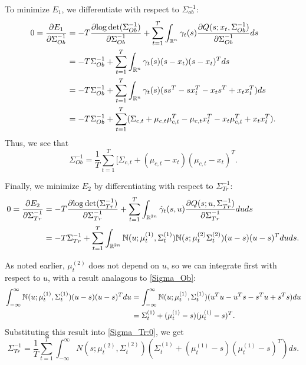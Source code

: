 \documentclass[12pt,leqno]{article}
\begin{document}
To minimize $E_1$, we differentiate with respect to $\Sigma_{ob}^{-1}$:
\begin{align*}
  0 = \frac{\partial{E_1}}{\partial{\Sigma_{Ob}^{-1}}} &= -T\frac{\partial{\log\det(\Sigma_{Ob}^{-1})}}{\partial\Sigma_{Ob}^{-1}}
  + \sum_{t=1}^T\int_{{\mathbb R}^n}\gamma_t(s)\frac{\partial{Q(s;x_t,\Sigma_{Ob}^{-1})}}{\partial{\Sigma_{Ob}^{-1}}}ds \\
  &= -T\Sigma_{Ob}^{-1} + \sum_{t=1}^T\int_{{\mathbb R}^n}\gamma_t(s)(s-x_t)(s-x_t)^Tds\\
  &= -T\Sigma_{Ob}^{-1} + \sum_{t=1}^T\int_{{\mathbb R}^n}\gamma_t(s)(ss^T - sx_t^T - x_ts^T + x_tx_t^T)ds \\
  &= -T\Sigma_{Ob}^{-1} + \sum_{t=1}^T(\Sigma_{c,t} + \mu_{c,t}\mu_{c,t}^T -\mu_{c,t}x_t^T- x_t\mu_{c,t}^T + x_tx_t^T).
\end{align*}
Thus, we see that
\begin{equation}\label{Sigma_Ob}
  \Sigma_{Ob}^{-1} = \frac{1}{T}\sum_{t=1}^T [\Sigma_{c,t} + (\mu_{c,t}-x_t)(\mu_{c,t}-x_t)^T.
\end{equation}

Finally, we minimize $E_2$ by differentiating with respect to $\Sigma_{Tr}^{-1}$:
\begin{equation}\label{Sigma_Tr:0}
  \begin{split}
  0 = \frac{\partial{E_2}}{\partial{\Sigma_{Tr}^{-1}}} &= -T\frac{\partial{\log\det(\Sigma_{Tr}^{-1})}}{\partial\Sigma_{Tr}^{-1}}
  + \sum_{t=1}^T\int_{{\mathbb R}^{2n}}\hat{\gamma}_t(s,u)\frac{\partial{Q(s;u,\Sigma_{Tr}^{-1})}}{\partial\Sigma_{Tr}^{-1}}duds \\
      &= -T\Sigma_{Tr}^{-1} + \sum_{t=1}^T\int_{{\mathbb R}^{2n}}{\mathbb N}(u;\mu^{(1)}_t,\Sigma^{(1)}_t){\mathbb N}(s;\mu^{(2)}_t\Sigma^{(2)}_t)(u-s)(u-s)^Tduds.
  \end{split}
\end{equation}

As noted earlier, $\mu^{(2)}_t$ does not depend on $u$, so we can integrate first with respect to $u$, with a result
analagous to \eqref{Sigma_Ob}:
\begin{align*}
  \int_{-\infty}^{\infty}{\mathbb N}(u;\mu^{(1)}_t,\Sigma^{(1)}_t)(u-s)(u-s)^Tdu &=
  \int_{-\infty}^{\infty}{\mathbb N}(u;\mu^{(1)}_t,\Sigma^{(1)}_t)(u^Tu - u^Ts -s^Tu + s^Ts)du\\
  &= \Sigma^{(1)}_t + (\mu^{(1)}_t - s)(\mu^{(1)}_t-s)^T.
\end{align*}
Substituting this result into \eqref{Sigma_Tr:0}, we get
\begin{equation}\label{Sigma_Tr:1}
\Sigma_{Tr}^{-1} = \frac{1}{T}\sum_{t=1}^T\int_{-\infty}^{\infty}N(s;\mu^{(2)}_t,\Sigma^{(2)}_t)(\Sigma^{(1)}_t+(\mu^{(1)}_t-s)(\mu^{(1)}_t-s)^T)ds.
\end{equation}
\end{document}
